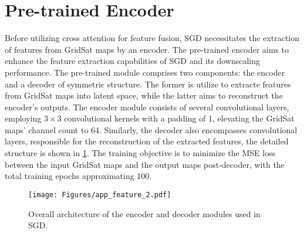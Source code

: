 \section{Pre-trained Encoder}
Before utilizing cross attention for feature fusion, SGD necessitates the extraction of features from GridSat maps by an encoder. 
The pre-trained encoder aims to enhance the feature extraction capabilities of SGD and its downscaling performance. 
The pre-trained module comprises two components: the encoder and a decoder of symmetric structure. 
The former is utilize to extracte features from GridSat maps into latent space, while the latter aims to reconstruct the encoder's outputs. 
The encoder module consists of several convolutional layers, employing $3\times 3$ convolutional kernels with a padding of 1, elevating the GridSat maps' channel count to 64. Similarly, the decoder also encompasses convolutional layers, responsible for the reconstruction of the extracted features, the detailed structure is shown in \cref{fig:app_feature}. 
The training objective is to minimize the MSE loss between the input GridSat maps and the output maps post-decoder, with the total training epochs approximating 100. 

\begin{figure}[t]
    \centering
\texttt{[image: Figures/app\_feature\_2.pdf]}
    \caption{Overall architecture of the encoder and decoder modules used in SGD. }
    \label{fig:app_feature}
\end{figure}